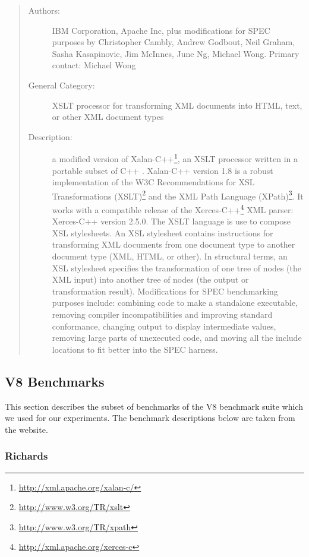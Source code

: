 \documentclass[onecolumn, openright, master, english, signatures]{dbrgrptt}
\begin{document}
\begin{quote}
\begin{description}
\item[Authors:] IBM Corporation, Apache Inc, plus modifications for SPEC purposes by Christopher Cambly, Andrew Godbout, Neil Graham, Sasha Kasapinovic, Jim McInnes, June Ng, Michael Wong. Primary contact: Michael Wong

\item[General Category:] XSLT processor for transforming XML documents into HTML, text, or other XML document types

\item[Description:] a modified version of Xalan-C++\footnote{\url{http://xml.apache.org/xalan-c/}}, an XSLT processor written in a portable subset of C++ . Xalan-C++ version 1.8 is a robust implementation of the W3C Recommendations for XSL Transformations (XSLT)\footnote{\url{http://www.w3.org/TR/xslt}} and the XML Path Language (XPath)\footnote{\url{http://www.w3.org/TR/xpath}}. It works with a compatible release of the Xerces-C++\footnote{\url{http://xml.apache.org/xerces-c}} XML parser: Xerces-C++ version 2.5.0. The XSLT language is use to compose XSL stylesheets. An XSL stylesheet contains instructions for transforming XML documents from one document type to another document type (XML, HTML, or other). In structural terms, an XSL stylesheet specifies the transformation of one tree of nodes (the XML input) into another tree of nodes (the output or transformation result).
Modifications for SPEC benchmarking purposes include: combining code to make a standalone executable, removing compiler incompatibilities and improving standard conformance, changing output to display intermediate values, removing large parts of unexecuted code, and moving all the include locations to fit better into the SPEC harness.
\end{description}
\end{quote}

\subsection{V8 Benchmarks}

This section describes the subset of benchmarks of the V8 benchmark suite \cite{v8benchmarks} which we used for our experiments. The benchmark descriptions below are taken from the website.

\subsubsection{Richards}
\end{document}
